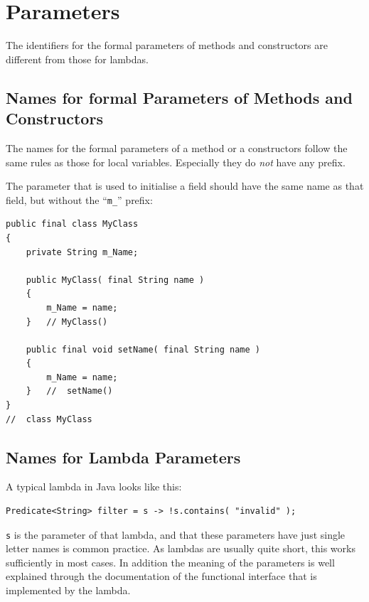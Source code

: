 \documentclass[11pt,a4paper, titlepage, parskip=half, headsepline, footsepline, cleardoublepage=current, headheight=1cm]{scrbook}
\begin{document}
\section{Parameters}
The identifiers for the formal parameters of methods and constructors are different from those for lambdas.


\subsection{Names for formal Parameters of Methods and Constructors}\label{sec:NamesForFormalParameters}
The names for the formal parameters of a method or a constructors follow the same rules as those for local variables. Especially they do \textit{not} have any prefix.

The parameter that is used to initialise a field should have the same name as that field, but without the “\verb#m_#” prefix:
\begin{lstlisting}
public final class MyClass
{
    private String m_Name;
    
    public MyClass( final String name )
    {
        m_Name = name;
    }   // MyClass()
    
    public final void setName( final String name )
    {
        m_Name = name;
    }   //  setName()
}
//  class MyClass
\end{lstlisting}


\subsection{Names for Lambda Parameters}\label{sec:NamesForLambdaParameters}
A typical lambda in Java looks like this:
\begin{lstlisting}
Predicate<String> filter = s -> !s.contains( "invalid" );
\end{lstlisting}
\lstinline|s| is the parameter of that lambda, and that these parameters have just single letter names is common practice. As lambdas are usually quite short, this works sufficiently in most cases. In addition the meaning of the parameters is well explained through the documentation of the functional interface that is implemented by the lambda.
\end{document}
